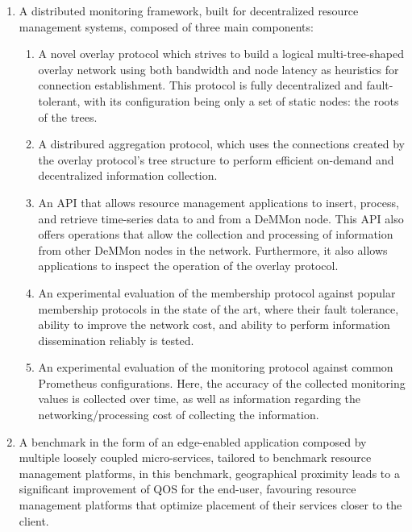 \begin{enumerate}
    \item A distributed monitoring framework, built for decentralized resource management systems, composed of three main components: {
        \begin{enumerate}
            \item A novel overlay protocol which strives to build a logical multi-tree-shaped overlay network using both bandwidth and node latency as heuristics for connection establishment. This protocol is fully decentralized and fault-tolerant, with its configuration being only a set of static nodes: the roots of the trees.
            
            \item A distribured aggregation protocol, which uses the connections created by the overlay protocol's tree structure to perform efficient on-demand and decentralized information collection.
            
            \item An API that allows resource management applications to insert, process, and retrieve time-series data to and from a DeMMon node. This API also offers operations that allow the collection and processing of information from other DeMMon nodes in the network. Furthermore, it also allows applications to inspect the operation of the overlay protocol.
            
            \item An experimental evaluation of the membership protocol against popular membership protocols in the state of the art, where their fault tolerance, ability to improve the network cost, and ability to perform information dissemination reliably is tested. 

            \item An experimental evaluation of the monitoring protocol against common Prometheus \cite{prometheus} configurations. Here, the accuracy of the collected monitoring values is collected over time, as well as information regarding the networking/processing cost of collecting the information.
            
        \end{enumerate}
        }
    \item A benchmark in the form of an edge-enabled application composed by multiple loosely coupled micro-services, tailored to benchmark resource management platforms, in this benchmark, geographical proximity leads to a significant improvement of QOS for the end-user, favouring resource management platforms that optimize placement of their services closer to the client.
    
\end{enumerate}

